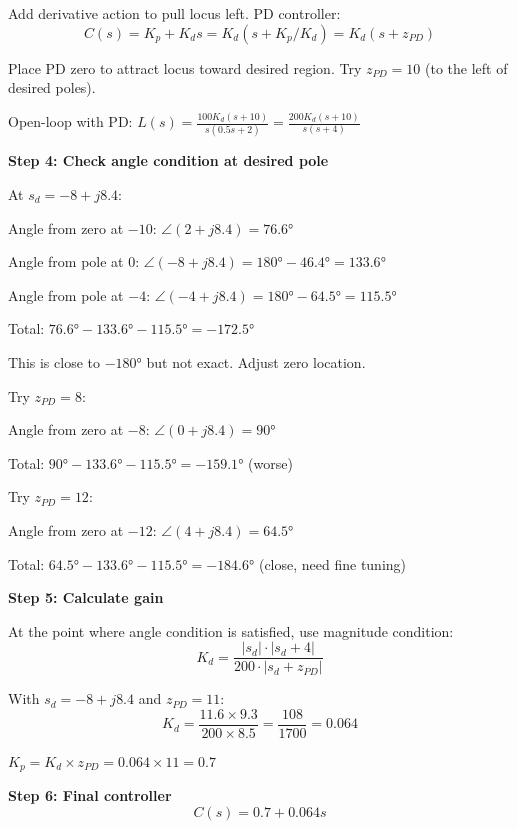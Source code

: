 Add derivative action to pull locus left. PD controller:
\begin{equation}
C(s) = K_p + K_d s = K_d(s + K_p/K_d) = K_d(s + z_{PD})
\end{equation}

Place PD zero to attract locus toward desired region. Try $z_{PD} = 10$ (to the left of desired poles).

Open-loop with PD: $L(s) = \frac{100 K_d (s+10)}{s(0.5s+2)} = \frac{200 K_d (s+10)}{s(s+4)}$

\textbf{Step 4: Check angle condition at desired pole}

At $s_d = -8 + j8.4$:

Angle from zero at $-10$: $\angle(2 + j8.4) = 76.6°$

Angle from pole at $0$: $\angle(-8 + j8.4) = 180° - 46.4° = 133.6°$

Angle from pole at $-4$: $\angle(-4 + j8.4) = 180° - 64.5° = 115.5°$

Total: $76.6° - 133.6° - 115.5° = -172.5°$

This is close to $-180°$ but not exact. Adjust zero location.

Try $z_{PD} = 8$:

Angle from zero at $-8$: $\angle(0 + j8.4) = 90°$

Total: $90° - 133.6° - 115.5° = -159.1°$ (worse)

Try $z_{PD} = 12$:

Angle from zero at $-12$: $\angle(4 + j8.4) = 64.5°$

Total: $64.5° - 133.6° - 115.5° = -184.6°$ (close, need fine tuning)

\textbf{Step 5: Calculate gain}

At the point where angle condition is satisfied, use magnitude condition:
\begin{equation}
K_d = \frac{|s_d| \cdot |s_d + 4|}{200 \cdot |s_d + z_{PD}|}
\end{equation}

With $s_d = -8 + j8.4$ and $z_{PD} = 11$:
\begin{equation}
K_d = \frac{11.6 \times 9.3}{200 \times 8.5} = \frac{108}{1700} = 0.064
\end{equation}

$K_p = K_d \times z_{PD} = 0.064 \times 11 = 0.7$

\textbf{Step 6: Final controller}
\begin{equation}
C(s) = 0.7 + 0.064s
\end{equation}

